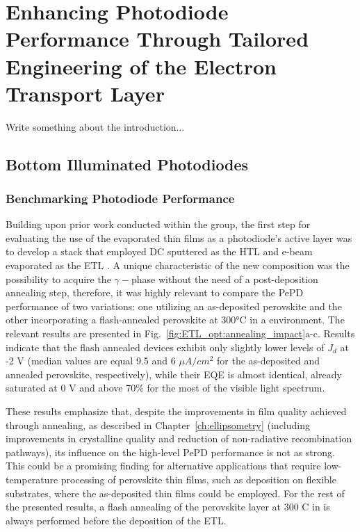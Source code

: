 \chapter{Enhancing Photodiode Performance Through Tailored Engineering of the Electron Transport Layer}\label{ch:transport_layer}


Write something about the introduction...

\section{Bottom Illuminated Photodiodes}

\subsection{Benchmarking Photodiode Performance}

Building upon prior work conducted within the group, the first step for evaluating the use of the evaporated  thin films as a photodiode's active layer was to develop a stack that employed DC sputtered  as the HTL and e-beam evaporated  as the ETL \cite{PintorMonroy2021All-EvaporatedApplications}. A unique characteristic of the new composition was the possibility to acquire the $\gamma-$phase without the need of a post-deposition annealing step, therefore, it was highly relevant to compare the PePD performance of two variations: one utilizing an as-deposited perovskite and the other incorporating a flash-annealed perovskite at 300°C in a  environment. The relevant results are presented in Fig.~\ref{fig:ETL_opt:annealing_impact}a-c. Results indicate that the flash annealed devices exhibit only slightly lower levels of $J_d$ at -2 V (median values are equal 9.5 and 6 $\mu A/cm^2$ for the as-deposited and annealed perovskite, respectively), while their EQE is almost identical, already saturated at 0 V and above 70\% for the most of the visible light spectrum. 

These results emphasize that, despite the improvements in film quality achieved through annealing, as described in Chapter~\ref{ch:ellipsometry} (including improvements in crystalline quality and reduction of non-radiative recombination pathways), its influence on the high-level PePD performance is not as strong. This could be a promising finding for alternative applications that require low-temperature processing of perovskite thin films, such as deposition on flexible substrates, where the as-deposited  thin films could be employed. For the rest of the presented results, a flash annealing of the perovskite layer at 300 \degree C in  is always performed before the deposition of the ETL. 

